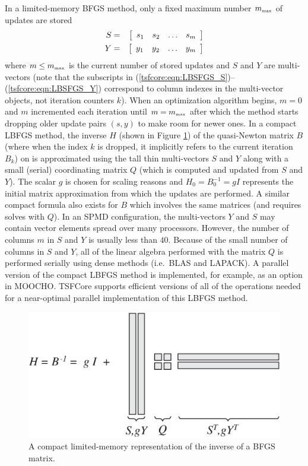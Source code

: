 In a limited-memory BFGS method, only a fixed maximum number
$m_{\tiny\mbox{max}}$ of updates are stored
%
\begin{eqnarray}
S & = & {\bmat{cccc} s_1 & s_2 & \ldots & s_{m} \emat} \label{tsfcore:eqn:LBSFGS_S}\\
Y & = & {\bmat{cccc} y_1 & y_2 & \ldots & y_{m} \emat} \label{tsfcore:eqn:LBSFGS_Y}
\end{eqnarray}
%
where $m \le m_{\tiny\mbox{max}}$ is the current number of stored
updates and $S$ and $Y$ are multi-vectors (note that the subscripts in
(\ref{tsfcore:eqn:LBSFGS_S})--(\ref{tsfcore:eqn:LBSFGS_Y}) correspond
to column indexes in the multi-vector objects, not iteration counters
$k$).  When an optimization algorithm begins, $m=0$ and $m$
incremented each iteration until $m = m_{\tiny\mbox{max}}$ after which
the method starts dropping older update pairs $(s,y)$ to make room for
newer ones.  In a compact LBFGS method, the inverse $H$ (shown in
Figure \ref{tsfcore:fig:LBFGS}) of the quasi-Newton matrix $B$ (where
when the index $k$ is dropped, it implicitly refers to the current
iteration $B_k$) on is approximated using the tall thin multi-vectors
$S$ and $Y$ along with a small (serial) coordinating matrix $Q$ (which
is computed and updated from $S$ and $Y$).  The scalar $g$ is chosen
for scaling reasons and $H_0 = B_0^{-1} = g I$ represents the initial
matrix approximation from which the updates are performed.  A similar
compact formula also exists for $B$ which involves the same matrices
(and requires solves with $Q$).  In an SPMD configuration, the
multi-vectors $Y$ and $S$ may contain vector elements spread over many
processors.  However, the number of columns $m$ in $S$ and $Y$ is
usually less than $40$.  Because of the small number of columns in $S$
and $Y$, all of the linear algebra performed with the matrix $Q$ is
performed serially using dense methods (i.e.~BLAS and LAPACK).  A
parallel version of the compact LBFGS method is implemented, for
example, as an option in MOOCHO.  TSFCore supports efficient versions
of all of the operations needed for a near-optimal parallel
implementation of this LBFGS method.

{\bsinglespace
\begin{figure}[t]
\begin{center}
\includegraphics*[bb= 0.0in 0.0in 7.0in 3.7in,angle=0,scale=0.60
]{LBFGS}
\end{center}
\caption{
\label{tsfcore:fig:LBFGS}
A compact limited-memory representation of the inverse of a BFGS matrix.
}
\end{figure}
\esinglespace}

